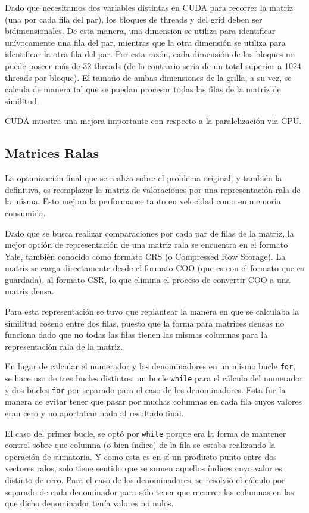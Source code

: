 \documentclass[11pt, a4paper]{article}
\begin{document}
  Dado que necesitamos dos variables distintas en CUDA para recorrer la matriz
  (una por cada fila del par), los bloques de threads y del grid deben ser
  bidimensionales. De esta manera, una dimension se utiliza para identificar
  unívocamente una fila del par, mientras que la otra dimensión se utiliza para
  identificar la otra fila del par. Por esta razón, cada dimensión de los
  bloques no puede poseer más de 32 threads (de lo contrario sería de un total
  superior a 1024 threads por bloque). El tamaño de ambas dimensiones de la
  grilla, a su vez, se calcula de manera tal que se puedan procesar todas las
  filas de la matriz de similitud.

  CUDA muestra una mejora importante con respecto a la paralelización via CPU.

  \subsection{Matrices Ralas}

  La optimización final que se realiza sobre el problema original, y también la
  definitiva, es reemplazar la matriz de valoraciones por una representación
  rala de la misma. Esto mejora la performance tanto en velocidad como en
  memoria consumida.
  
  Dado que se busca realizar comparaciones por cada par de filas de la matriz,
  la mejor opción de representación de una matriz rala se encuentra en el
  formato Yale, también conocido como formato CRS (o Compressed Row Storage).
  La matriz se carga directamente desde el formato COO (que es con el formato
  que es guardada), al formato CSR, lo que elimina el proceso de convertir COO
  a una matriz densa.

  Para esta representación se tuvo que replantear la manera en que se calculaba
  la similitud coseno entre dos filas, puesto que la forma para matrices densas
  no funciona dado que no todas las filas tienen las mismas columnas para la
  representación rala de la matriz.

  En lugar de calcular el numerador y los denominadores en un mismo bucle
  \texttt{for}, se hace uso de tres bucles distintos: un bucle \texttt{while}
  para el cálculo del numerador y dos bucles \texttt{for} por separado para el
  caso de los denominadores. Esta fue la manera de evitar tener que pasar por
  muchas columnas en cada fila cuyos valores eran cero y no aportaban nada al
  resultado final.

  El caso del primer bucle, se optó por \texttt{while} porque era la forma de
  mantener control sobre que columna (o bien índice) de la fila se estaba
  realizando la operación de sumatoria. Y como esta es en sí un producto punto
  entre dos vectores ralos, solo tiene sentido que se sumen aquellos índices
  cuyo valor es distinto de cero.  Para el caso de los denominadores, se
  resolvió el cálculo por separado de cada denominador para sólo tener que
  recorrer las columnas en las que dicho denominador tenía valores no nulos.
\end{document}
